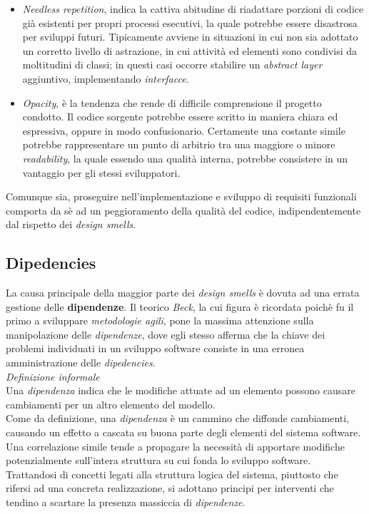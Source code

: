 \documentclass{article}
\begin{document}
\begin{itemize}[label={-}]
    \item \textit{Needless repetition}, indica la cattiva abitudine di riadattare porzioni di codice già esistenti per propri processi esecutivi, la quale potrebbe essere disastrosa per sviluppi futuri. Tipicamente avviene in situazioni in cui non sia adottato un corretto livello di astrazione, in cui attività ed elementi sono condivisi da moltitudini di classi; in questi casi occorre stabilire un \textit{abstract layer} aggiuntivo, implementando \textit{interfacce}.
    \item \textit{Opacity}, è la tendenza che rende di difficile comprensione il progetto condotto. Il codice sorgente potrebbe essere scritto in maniera chiara ed espressiva, oppure in modo confusionario. Certamente una costante simile potrebbe rappresentare un punto di arbitrio tra una maggiore o minore \textit{readability}, la quale essendo una qualità interna, potrebbe consistere in un vantaggio per gli stessi sviluppatori. 
\end{itemize}
Comunque sia, proseguire nell'implementazione e sviluppo di requisiti funzionali comporta da sè ad un peggioramento della qualità del codice, indipendentemente dal rispetto dei \textit{design smells}.
\subsection*{Dipedencies}
\large
La causa principale della maggior parte dei \textit{design smells} è dovuta ad una errata gestione delle \textbf{dipendenze}. Il teorico \textit{Beck}, la cui figura è ricordata poichè fu il primo a sviluppare \textit{metodologie agili}, pone la massima attenzione sulla manipolazione delle \textit{dipendenze}, dove egli stesso afferma che la chiave dei problemi individuati in un sviluppo software consiste in una erronea amministrazione delle \textit{dipedencies}.\vspace*{14pt}\\
\textit{Definizione informale}\\
Una \textit{dipendenza} indica che le modifiche attuate ad un elemento possono causare cambiamenti per un altro elemento del modello.\vspace*{14pt}\\
Come da definizione, una \textit{dipendenza} è un cammino che diffonde cambiamenti, causando un effetto a cascata su buona parte degli elementi del sistema software. Una correlazione simile tende a propagare la necessità di apportare modifiche potenzialmente sull'intera struttura su cui fonda lo sviluppo software.\vspace*{14pt}\\
Trattandosi di concetti legati alla struttura logica del sistema, piuttosto che rifersi ad una concreta realizzazione, si adottano principi per interventi che tendino a scartare la presenza massiccia di \textit{dipendenze}.
\end{document}
